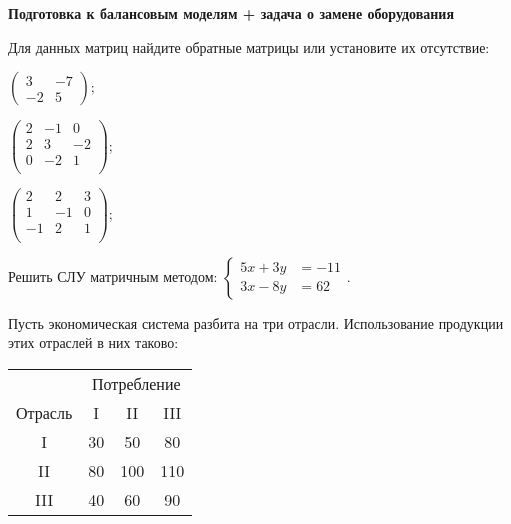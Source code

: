\documentclass[a5paper,11pt]{extarticle}
\begin{document}
\begin{enumerate}
  {\item[]
          \bfseries Подготовка к балансовым моделям + задача о замене оборудования
          \par\vspace{1mm}
  }

\item 
	Для данных матриц найдите обратные матрицы или установите их отсутствие: \\
	\begin{enumerate*}
	\item 
		$\begin{pmatrix}
			3&-7\\
			-2&5
		\end{pmatrix}$;

	\item 
		${\begin{pmatrix}
			2&-1& 0\\
			2&3& -2\\
			0&-2& 1\\
		\end{pmatrix}}$;
	\item 
	$\begin{pmatrix}
		2&2&3\\
		1&-1&0\\
		-1&2&1\\
	\end{pmatrix}$;	
\end{enumerate*}  
  \item 
  Решить СЛУ матричным методом:
    $
    \left\lbrace\begin{aligned}
      5x+3y &= -11\\
      3x-8y &= 62
    \end{aligned}\right.
    $.
  \item 
  Пусть экономическая система разбита на три отрасли. 
  Использование продукции этих отраслей в них таково:

{\centering  
\begin{tabular}{c|ccc}
	& \multicolumn{3}{c}{Потребление}\\
	 Отрасль& I  & II & III\\
	\hline
	 I  & 30 & 50  & 80  \\
	II  & 80 & 100 & 110 \\
	III & 40 & 60  & 90 \\
\end{tabular}\par}


\end{enumerate}
\end{document}
